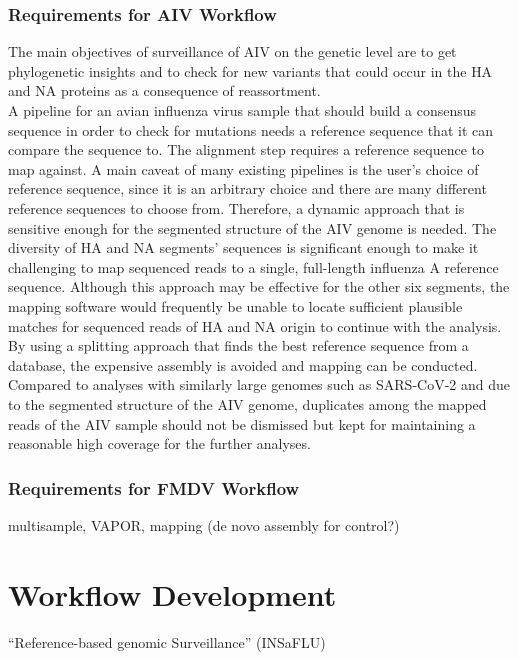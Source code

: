 \subsubsection{Requirements for AIV Workflow}
The main objectives of surveillance of \ac{AIV} on the genetic level are to get phylogenetic insights and to check for new variants that could occur in the \ac{HA} and \ac{NA} proteins as a consequence of reassortment. \\
A pipeline for an avian influenza virus sample that should build a consensus sequence in order to check for mutations needs a reference sequence that it can compare the sequence to. The alignment step requires a reference sequence to map against. A main caveat of many existing pipelines is the user's choice of reference sequence, since it is an arbitrary choice and there are many different reference sequences to choose from. Therefore, a dynamic approach that is sensitive enough for the segmented structure of the \ac{AIV} genome is needed. The diversity of \ac{HA} and \ac{NA} segments' sequences is significant enough to make it challenging to map sequenced reads to a single, full-length influenza A reference sequence. Although this approach may be effective for the other six segments, the mapping software would frequently be unable to locate sufficient plausible matches for sequenced reads of \ac{HA} and \ac{NA} origin to continue with the analysis. By using a splitting approach that finds the best reference sequence from a database, the expensive assembly is avoided and mapping can be conducted. \\
Compared to analyses with similarly large genomes such as \ac{SARS-CoV-2} and due to the segmented structure of the \ac{AIV} genome, duplicates among the mapped reads of the \ac{AIV} sample should not be dismissed but kept for maintaining a reasonable high coverage for the further analyses. 

\subsubsection{Requirements for FMDV Workflow}
multisample, VAPOR, mapping (de novo assembly for control?)

\section{Workflow Development}
``Reference-based genomic Surveillance'' (\ac{INSaFLU})

